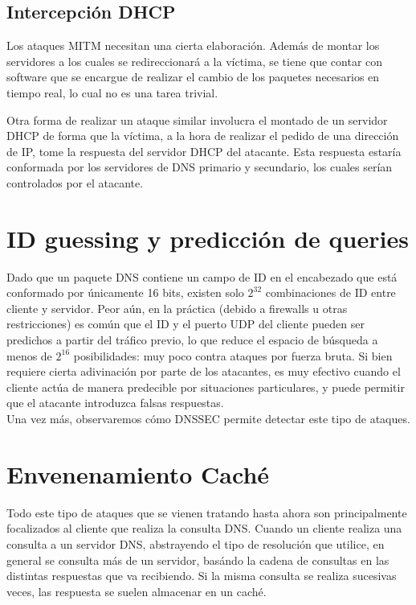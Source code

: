 \subsection{Intercepci\'on DHCP}

Los ataques MITM necesitan una cierta elaboraci\'on. Adem\'as de montar los
servidores a los cuales se redireccionar\'a a la v\'ictima, se tiene que contar
con software que se encargue de realizar el cambio de los paquetes necesarios en
tiempo real, lo cual no es una tarea trivial. 

Otra forma de realizar un ataque similar involucra el montado de un servidor
DHCP de forma que la v\'ictima, a la hora de realizar el pedido de una
direcci\'on de IP, tome la respuesta del servidor DHCP del atacante. Esta
respuesta estar\'ia conformada por los servidores de DNS primario y secundario,
los cuales ser\'ian controlados por el atacante.

\section{ID guessing y predicci\'on de queries}

Dado que un paquete DNS contiene un campo de ID en el encabezado que est\'a conformado por \'unicamente 16 bits, existen solo $2^{32}$ combinaciones de ID entre cliente y servidor. Peor a\'un, en la pr\'actica (debido a firewalls u otras restricciones) es com\'un que el ID y el puerto UDP del cliente pueden ser predichos a partir del tr\'afico previo, lo que reduce el espacio de b\'usqueda a menos de $2^{16}$ posibilidades: muy poco contra ataques por fuerza bruta. Si bien requiere cierta adivinaci\'on por parte de los atacantes, es muy efectivo cuando el cliente act\'ua de manera predecible por situaciones particulares, y puede permitir que el atacante introduzca falsas respuestas.\\
Una vez m\'as, observaremos c\'omo DNSSEC permite detectar este tipo de ataques.

\section{Envenenamiento Cach\'e}

Todo este tipo de ataques que se vienen tratando hasta ahora son principalmente
focalizados al cliente que realiza la consulta DNS. Cuando un cliente realiza
una consulta a un servidor DNS, abstrayendo el tipo de resoluci\'on que utilice,
en general se consulta m\'as de un servidor, bas\'ando la cadena de consultas en
las distintas respuestas que va recibiendo. Si la misma consulta se realiza
sucesivas veces, las respuesta se suelen almacenar en un cach\'e.

